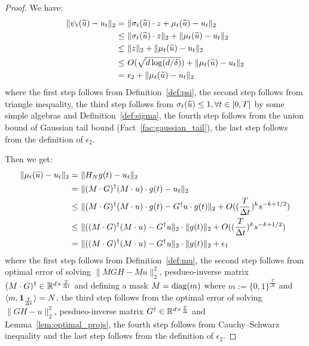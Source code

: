 \begin{proof}
    We have:
    \begin{align*}
        \| \psi_t(\widetilde{u}) - u_t \|_2
        = & ~ \| \sigma_t(\widetilde{u}) \cdot z + \mu_t(\widetilde{u}) - u_t \|_2 \\
        \leq & ~ \| \sigma_t(\widetilde{u}) \cdot z \|_2 + \|  \mu_t(\widetilde{u}) - u_t \|_2 \\
        \leq & ~ \| z \|_2 + \|  \mu_t(\widetilde{u}) - u_t \|_2 \\
        \leq & ~ O( \sqrt{d \log(d/\delta)} ) +  \|  \mu_t(\widetilde{u}) - u_t \|_2 \\
        = & ~ \epsilon_2 + \|  \mu_t(\widetilde{u}) - u_t \|_2
    \end{align*}
    where the first step follows from Definition~\ref{def:psi}, the second step follows from triangle inequality, the third step follows from $\sigma_t(\widetilde{u}) \leq 1, \forall t \in [0, T]$ by some simple algebras and Definition~\ref{def:sigma}, the fourth step follows from the union bound of Gaussian tail bound (Fact~\ref{fac:gaussian_tail}), the last step follows from the definition of $\epsilon_2$.

    Then we get:
    \begin{align*}
        \|  \mu_t(\widetilde{u}) - u_t \|_2
        = & ~ \| H_N g(t) - u_t \|_2 \\
        = & ~ \| (M \cdot G)^\dagger (M \cdot u) \cdot g(t) - u_t \|_2 \\
        \leq & ~ \| (M \cdot G)^\dagger (M \cdot u) \cdot g(t) - G^\dagger u \cdot g(t) \|_2 + O((\frac{T}{\Delta t})^k s^{-k+1/2}) \\
        \leq & ~ \| ((M \cdot G)^\dagger (M \cdot u) - G^\dagger u \|_2 \cdot \| g(t) \|_2 + O((\frac{T}{\Delta t})^k s^{-k+1/2}) \\
        = & ~ \| ((M \cdot G)^\dagger (M \cdot u) - G^\dagger u \|_2 \cdot \| g(t) \|_2 + \epsilon_1
    \end{align*}
    where the first step follows from Definition~\ref{def:mu}, the second step follows from optimal error of solving $\| M G H - M u \|_2^2$, pesdueo-inverse matrix $(M \cdot G)^\dag \in \mathbb{R}^{d \times \frac{T}{\Delta t}}$ and defining a mask $M = \operatorname{diag}(m)$ where $m := \{0, 1\}^{\frac{T}{\Delta t}}$ and $\langle m, {\bf 1}_{\frac{T}{\Delta t}} \rangle = N$, the third step follows from the optimal error of solving $\| G H - u \|_2^2$, pesdueo-inverse matrix $G^\dag \in \mathbb{R}^{d \times \frac{T}{\Delta}}$ and Lemma~\ref{lem:optimal_projs}, the fourth step follows from Cauchy–Schwarz inequality and the last step follows from the definition of $\epsilon_2$.


\end{proof}
